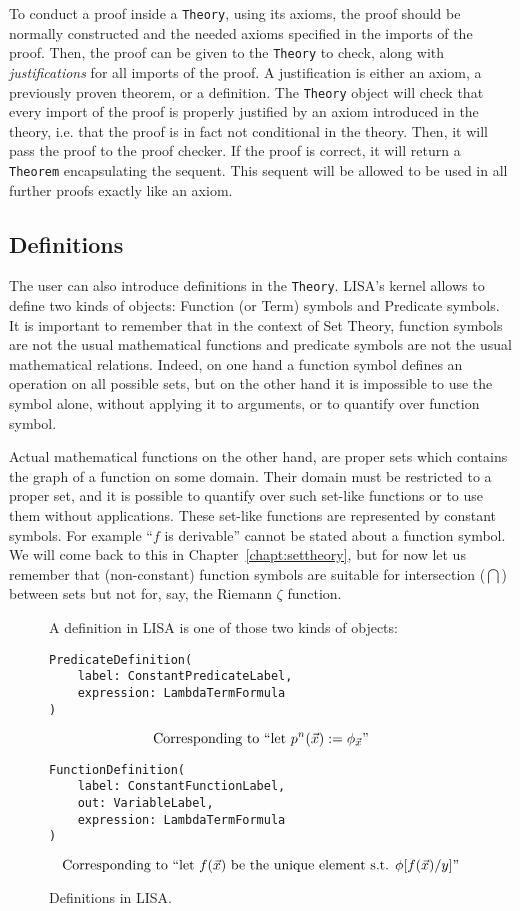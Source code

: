 To conduct a proof inside a \lstinline{Theory}{}, using its axioms, the proof should be normally constructed and the needed axioms specified in the imports of the proof. Then, the proof can be given to the \lstinline{Theory}{} to check, along with \textit{justifications} for all imports of the proof. A justification is either an axiom, a previously proven theorem, or a definition. The \lstinline{Theory}{} object will check that every import of the proof is properly justified by an axiom introduced in the theory, i.e. that the proof is in fact not conditional in the theory. Then, it will pass the proof to the proof checker. If the proof is correct, it will return a \lstinline{Theorem}{} encapsulating the sequent. This sequent will be allowed to be used in all further proofs exactly like an axiom.


\subsection{Definitions}
\label{subs:definitions}
The user can also introduce definitions in the \lstinline{Theory}{}.
LISA's kernel allows to define two kinds of objects: Function (or Term) symbols and Predicate symbols. It is important to remember that in the context of Set Theory, function symbols are not the usual mathematical functions and predicate symbols are not the usual mathematical relations. Indeed, on one hand a function symbol defines an operation on all possible sets, but on the other hand it is impossible to use the symbol alone, without applying it to arguments, or to quantify over function symbol.

Actual mathematical functions on the other hand, are proper sets which contains the graph of a function on some domain. Their domain must be restricted to a proper set, and it is possible to quantify over such set-like functions or to use them without applications. These set-like functions are represented by constant symbols.  For example ``$f$ is derivable'' cannot be stated about a function symbol. We will come back to this in Chapter~\ref{chapt:settheory}, but for now let us remember that (non-constant) function symbols are suitable for intersection ($\bigcap$) between sets but not for, say, the Riemann $\zeta$ function.


\begin{figure}
  A definition in LISA is one of those two kinds of objects:
  \begin{lstlisting}[frame=single]
PredicateDefinition(
    label: ConstantPredicateLabel,
    expression: LambdaTermFormula
)
\end{lstlisting}
  $$
    \textnormal{Corresponding to ``let } p^n(\vec{x}) := \phi_{\vec{x}}\textnormal{''}
  $$
  \begin{lstlisting}[frame=single]
FunctionDefinition(
    label: ConstantFunctionLabel,
    out: VariableLabel, 
    expression: LambdaTermFormula
)
\end{lstlisting}
  $$
    \textnormal{Corresponding to ``let } f(\vec{x}) \textnormal{ be the unique element s.t. } \phi[f(\vec{x})/y]\textnormal{''}
  $$
  \caption{Definitions in LISA.}
  \label{fig:definitions}
\end{figure}

